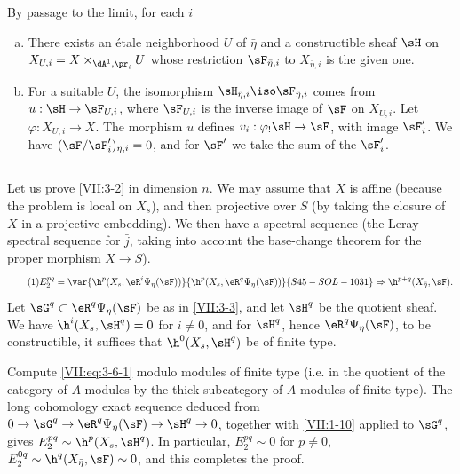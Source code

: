 By passage to the limit, for each $i$
\begin{enumerate}[a)]
  \item There exists an étale neighborhood $U$ of $\bar\eta$ and a
    constructible sheaf $\sH$ on
    $X_{U,i} = X\times_{\dA^1,\pr_i} U$ whose restriction
    $\sF_{\bar\eta,i}$ to $X_{\bar\eta,i}$ is the given one.
  \item For a suitable $U$, the isomorphism
    $\sH_{\bar\eta,i} \iso \sF_{\bar\eta,i}$ comes from
    $u:\sH\to \sF_{U,i}$, where $\sF_{U,i}$ is the inverse image of $\sF$ on
    $X_{U,i}$. Let $\varphi:X_{U,i} \to X$. The morphism $u$ defines
    $v_i:\varphi_! \sH \to \sF$, with image $\sF_i'$. We have
    $(\sF/\sF_i')_{\bar\eta,i} = 0$, and for $\sF'$ we take the sum of the
    $\sF_i'$.
\end{enumerate}






\subsection{}\label{VII:3-6}

Let us prove \ref{VII:3-2} in dimension $n$. We may assume that $X$ is affine
(because the problem is local on $X_s$), and then projective over $S$ (by
taking the closure of $X$ in a projective embedding). We then have a spectral
sequence \cite[I 2.2.3]{sga7} (the Leray spectral sequence for $\bar j$, taking
into account the base-change theorem for the proper morphism $X\to S$).
\begin{equation*}\tag{1}\label{VII:eq:3-6-1}
  E_2^{p q} = \var{\h^p(X_s,\eR^i\Psi_\eta(\sF))}{\h^p(X_s,\eR^q\Psi_\eta(\sF))}{S45-SOL-1031} \Rightarrow \h^{p+q}(X_{\bar\eta},\sF) \text{.} 
\end{equation*}
Let $\sG^q\subset \eR^q \Psi_\eta(\sF)$ be as in \ref{VII:3-3}, and let
$\sH^q$ be the quotient sheaf. We have $\h^i(X_s,\sH^q)=0$ for $i\ne 0$, and
for $\sH^q$, hence $\eR^q\Psi_\eta(\sF)$, to be constructible, it suffices
that $\h^0(X_s,\sH^q)$ be of finite type.

Compute \eqref{VII:eq:3-6-1} modulo modules of finite type (i.e. in the
quotient of the category of $A$-modules by the thick subcategory of
$A$-modules of finite type). The long cohomology exact sequence deduced from
$0 \to \sG^q \to \eR^q\Psi_\eta(\sF) \to \sH^q \to 0$, together with
\ref{VII:1-10} applied to $\sG^q$, gives
$E_2^{p q} \sim \h^p(X_s,\sH^q)$. In particular,
$E_2^{p q}\sim 0$ for $p\ne 0$,
$E_2^{0 q}\sim \h^q(X_{\bar\eta},\sF) \sim 0$, and this completes the proof.

